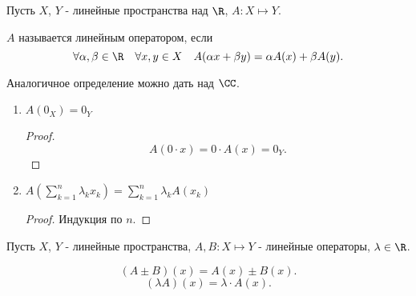 
\begin{definition} \thmslashn 

    Пусть $X$, $Y$ - линейные пространства над $\R$, $A : X \mapsto Y$.

    $A$ называется линейным оператором, если  
    \[ \forall{\alpha, \beta\in \R}\quad \forall{x, y\in X}\quad A(\alpha x + \beta y) = \alpha A(x) + \beta A(y) .\] 
\end{definition}
\begin{remark} \thmslashn

    Аналогичное определение можно дать над $\CC$.
\end{remark}
\begin{properties} \thmslashn

    \begin{enumerate}
        \item $A(0_{X}) = 0_{Y}$ 
            \begin{proof} \thmslashn
            
                \[ A(0 \cdot x) = 0 \cdot A(x) = 0_{Y} .\] 
            \end{proof}
        \item $A\left( \sum\limits_{k=1}^{n} \lambda_{k}x_{k} \right) = \sum\limits_{k=1}^{n} \lambda_{k}A(x_{k})$ 
            \begin{proof} \thmslashn
            
                Индукция по $n$.
            \end{proof}
    \end{enumerate}
\end{properties}
\begin{definition} \thmslashn 

    Пусть $X$, $Y$ - линейные пространства, $A, B : X \mapsto Y$ - линейные операторы, $\lambda\in \R$.

    \[ (A \pm B)(x) = A(x) \pm B(x) .\]
    \[ (\lambda A)(x) = \lambda \cdot A(x) .\] 
\end{definition}
